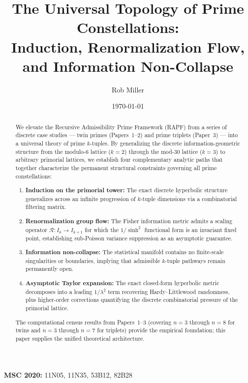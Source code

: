 \documentclass[11pt]{article}
\title{The Universal Topology of Prime Constellations:\\ Induction, Renormalization Flow, and Information Non-Collapse}
\author{Rob Miller}
\date{\today}
\theoremstyle{remark}
\begin{document}
\maketitle

\begin{abstract}
We elevate the Recursive Admissibility Prime Framework (RAPF) from a
series of discrete case studies --- twin primes (Papers~1--2) and
prime triplets (Paper~3) --- into a universal theory of
prime $k$-tuples. By generalizing the discrete information-geometric
structure from the modulo-6 lattice ($k=2$) through the mod-30 lattice
($k=3$) to arbitrary primorial lattices, we establish four complementary
analytic paths that together characterize the permanent structural
constraints governing all prime constellations:

\begin{enumerate}
    \item \textbf{Induction on the primorial tower:} The exact discrete
    hyperbolic structure generalizes across an infinite progression of
    $k$-tuple dimensions via a combinatorial filtering matrix.
    \item \textbf{Renormalization group flow:} The Fisher information
    metric admits a scaling operator $\mathcal{R}: I_k \to I_{k+1}$
    for which the $1/\sinh^2$ functional form is an invariant fixed
    point, establishing sub-Poisson variance suppression as an
    asymptotic guarantee.
    \item \textbf{Information non-collapse:} The statistical manifold
    contains no finite-scale singularities or boundaries, implying
    that admissible $k$-tuple pathways remain permanently open.
    \item \textbf{Asymptotic Taylor expansion:} The exact closed-form
    hyperbolic metric decomposes into a leading $1/\lambda^2$ term
    recovering Hardy--Littlewood randomness, plus higher-order
    corrections quantifying the discrete combinatorial pressure
    of the primorial lattice.
\end{enumerate}

The computational census results from Papers~1--3 (covering $n=3$ through $n=8$ for twins and $n=3$ through $n=7$
for triplets) provide the empirical
foundation; this paper supplies the unified theoretical architecture.
\end{abstract}

\noindent \textbf{MSC 2020:} 11N05, 11N35, 53B12, 82B28

\end{document}
